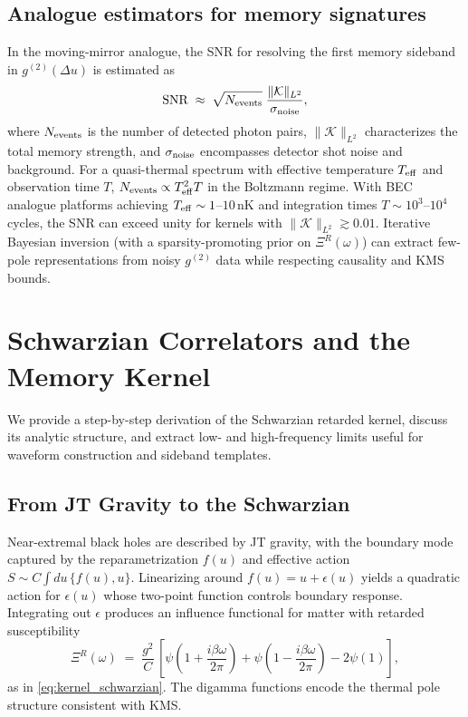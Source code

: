 \documentclass[aps,prd,preprint,onecolumn,superscriptaddress,nofootinbib,longbibliography,floatfix,11pt,showpacs,showkeys]{revtex4-2}
\theoremstyle{plain}
\theoremstyle{definition}
\theoremstyle{remark}
\begin{document}
\subsection{Analogue estimators for memory signatures}

\label{app:analog-estimator}
In the moving-mirror analogue, the SNR for resolving the first memory sideband in $g^{(2)}(\Delta u)$ is estimated as
\begin{equation}
\mathrm{SNR}\;\approx\;\sqrt{N_{\rm events}}\;\frac{\|\mathcal{K}\|_{L^2}}{\sigma_{\rm noise}},
\end{equation}
where $N_{\rm events}$ is the number of detected photon pairs, $\|\mathcal{K}\|_{L^2}$ characterizes the total memory strength, and $\sigma_{\rm noise}$ encompasses detector shot noise and background. For a quasi-thermal spectrum with effective temperature $T_{\rm eff}$ and observation time $T$, $N_{\rm events} \propto T_{\rm eff}^2 T$ in the Boltzmann regime. With BEC analogue platforms achieving $T_{\rm eff}\sim 1$--$10\,\mathrm{nK}$ and integration times $T\sim 10^3$--$10^4$ cycles, the SNR can exceed unity for kernels with $\|\mathcal{K}\|_{L^2}\gtrsim 0.01$. Iterative Bayesian inversion (with a sparsity-promoting prior on $\Xi^R(\omega)$) can extract few-pole representations from noisy $g^{(2)}$ data while respecting causality and KMS bounds.

\section{Schwarzian Correlators and the Memory Kernel}
\label{app:schwarzian_appendix} %
We provide a step-by-step derivation of the Schwarzian retarded kernel, discuss its analytic structure, and extract low- and high-frequency limits useful for waveform construction and sideband templates.

\subsection{From JT Gravity to the Schwarzian}
Near-extremal black holes are described by JT gravity, with the boundary mode captured by the reparametrization $f(u)$ and effective action $S\!\sim\!C\!\int du\,\{f(u),u\}$. Linearizing around $f(u)=u+\epsilon(u)$ yields a quadratic action for $\epsilon(u)$ whose two-point function controls boundary response. Integrating out $\epsilon$ produces an influence functional for matter with retarded susceptibility
\begin{equation}
\Xi^R(\omega)\;=\;\frac{g^2}{C}\,\left[\psi\!\left(1+\frac{i\beta\omega}{2\pi}\right)+\psi\!\left(1-\frac{i\beta\omega}{2\pi}\right)-2\psi(1)\right],
\end{equation}
as in \eqref{eq:kernel_schwarzian}. The digamma functions encode the thermal pole structure consistent with KMS.
\end{document}
